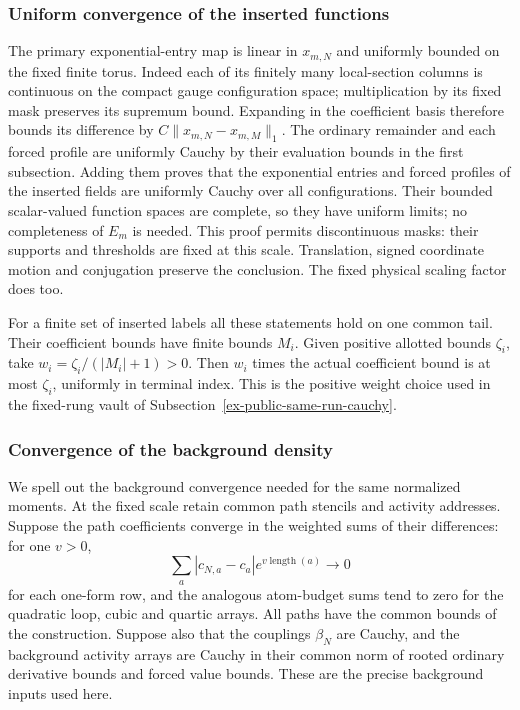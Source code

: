 \subsubsection{Uniform convergence of the inserted functions}
The primary exponential-entry map is linear in $x_{m,N}$ and
uniformly bounded on the fixed finite torus. Indeed each of its
finitely many local-section columns is continuous on the compact
gauge configuration space; multiplication by its fixed mask
preserves its supremum bound. Expanding in the coefficient basis
therefore bounds its difference by $C\|x_{m,N}-x_{m,M}\|_1$.
The ordinary remainder and each forced profile are uniformly
Cauchy by their evaluation bounds in the first subsection.
Adding them proves that the exponential entries and forced
profiles of the inserted fields are uniformly Cauchy over all
configurations. Their bounded scalar-valued function spaces are complete,
so they have uniform limits; no completeness of $E_m$ is needed. This proof permits discontinuous masks: their
supports and thresholds are fixed at this scale. Translation,
signed coordinate motion and conjugation preserve the conclusion.
The fixed physical scaling factor does too.

For a finite set of inserted labels all these statements hold
on one common tail. Their coefficient bounds have finite bounds
$M_i$. Given positive allotted bounds $\zeta_i$, take
$w_i=\zeta_i/(|M_i|+1)>0$. Then $w_i$ times the actual coefficient
bound is at most $\zeta_i$, uniformly in terminal index. This is
the positive weight choice used in the fixed-rung vault of
Subsection~\ref{ex-public-same-run-cauchy}.

\subsubsection{Convergence of the background density}
We spell out the background convergence needed for the same
normalized moments. At the fixed scale retain common path stencils
and activity addresses. Suppose the path coefficients converge in
the weighted sums of their differences: for one $v>0$,
\[
 \sum_a|c_{N,a}-c_a|e^{v\operatorname{length}(a)}\longrightarrow0
\]
for each one-form row, and the analogous atom-budget sums tend to
zero for the quadratic loop, cubic and quartic arrays. All paths
have the common bounds of the construction. Suppose also that the
couplings $\beta_N$ are Cauchy, and the background activity arrays
are Cauchy in their common norm of rooted ordinary derivative bounds
and forced value bounds. These are the precise background inputs used here.


